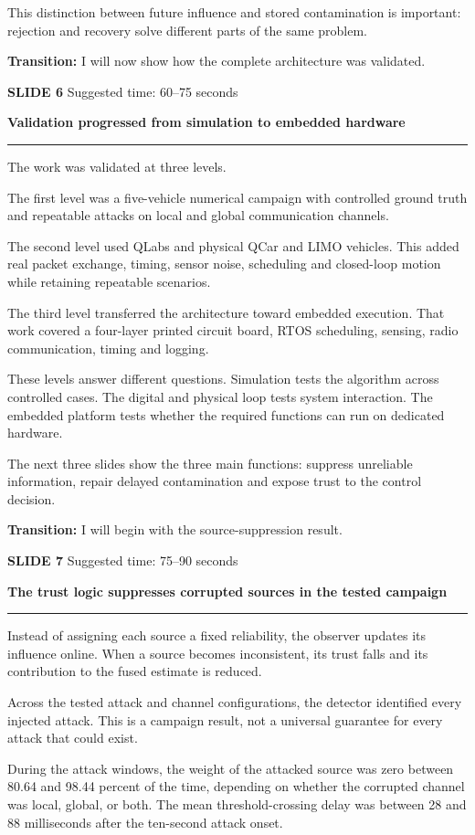 \documentclass[11pt,a4paper]{article}
\newcommand{\slidetitle}[3]{%
  \clearpage
  {\color{BrandCyan}\large\bfseries SLIDE #1}\hfill
  {\color{Muted}\small Suggested time: #3}\par
  \vspace{0.18cm}
  {\color{BrandBlue}\LARGE\bfseries #2}\par
  \vspace{0.20cm}
  {\color{BrandMagenta}\rule{1.1cm}{1.2pt}}\par
  \vspace{0.12cm}
}
\newcommand{\transition}[1]{%
  \vfill
  \colorbox{Panel}{%
    \parbox{\dimexpr\textwidth-2\fboxsep\relax}{%
      \raggedright\textbf{Transition:} #1}}
}
\begin{document}
This distinction between future influence and stored contamination is important: rejection and recovery solve different parts of the same problem.

\transition{I will now show how the complete architecture was validated.}

\slidetitle{6}{Validation progressed from simulation to embedded hardware}{60--75 seconds}

The work was validated at three levels.

The first level was a five-vehicle numerical campaign with controlled ground truth and repeatable attacks on local and global communication channels.

The second level used QLabs and physical QCar and LIMO vehicles. This added real packet exchange, timing, sensor noise, scheduling and closed-loop motion while retaining repeatable scenarios.

The third level transferred the architecture toward embedded execution. That work covered a four-layer printed circuit board, RTOS scheduling, sensing, radio communication, timing and logging.

These levels answer different questions. Simulation tests the algorithm across controlled cases. The digital and physical loop tests system interaction. The embedded platform tests whether the required functions can run on dedicated hardware.

The next three slides show the three main functions: suppress unreliable information, repair delayed contamination and expose trust to the control decision.

\transition{I will begin with the source-suppression result.}

\slidetitle{7}{The trust logic suppresses corrupted sources in the tested campaign}{75--90 seconds}

Instead of assigning each source a fixed reliability, the observer updates its influence online. When a source becomes inconsistent, its trust falls and its contribution to the fused estimate is reduced.

Across the tested attack and channel configurations, the detector identified every injected attack. This is a campaign result, not a universal guarantee for every attack that could exist.

During the attack windows, the weight of the attacked source was zero between 80.64 and 98.44 percent of the time, depending on whether the corrupted channel was local, global, or both. The mean threshold-crossing delay was between 28 and 88 milliseconds after the ten-second attack onset.
\end{document}
